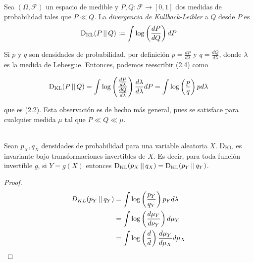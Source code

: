 \documentclass[main.tex]{subfiles}
\begin{document}
\begin{definition}
Sea $(\Omega, \mathcal{F})$ un espacio de medible y $P, Q: \mathcal{F} \to [0,1]$ dos medidas de probabilidad tales que $P\ll Q$. La \textit{divergencia de Kullback-Leibler} a $Q$ desde $P$ es
\begin{equation}
	\operatorname*{D_{KL}}(P\operatorname*{\mid\mid} Q) := \int\log\left(\frac{dP}{dQ}\right)dP
\end{equation}
\end{definition}

Si $p$ y $q$ son densidades de probabilidad, por definición $p=\frac{dP}{d\lambda}$ y $q=\frac{dQ}{d\lambda}$, donde $\lambda$ es la medida de Lebesgue. Entonces, podemos reescribir (2.4) como

\begin{equation*}
\operatorname*{D_{KL}}(P\operatorname*{\mid\mid} Q) = \int\log\left(
		\frac{\frac{dP}{d\lambda}}{\frac{dQ}{d\lambda}}
	\right)
	\frac{d\lambda}{d\lambda}dP	
	= \int\log\left(\frac{p}{q}\right)pd\lambda
\end{equation*}
 
que es (2.2). Esta observación es de hecho más general, pues se satisface para cualquier medida $\mu$ tal que $P\ll Q \ll \mu$. 
\begin{theorem} \ \\
Sean $p_X, q_X$ densidades de probabilidad para una variable aleatoria $X$. $\operatorname*{D_{KL}}$ es invariante bajo  transformaciones invertibles de $X$. Es decir, para toda función invertible $g$, si $Y=g(X)$ entonces $\operatorname*{D_{KL}}(p_X\operatorname*{\mid\mid} q_X) = \operatorname*{D_{KL}}(p_Y\operatorname*{\mid\mid} q_Y)$.

\end{theorem}

\begin{proof} \ \\
\begin{align*}
D_{KL}(p_Y\operatorname*{\mid\mid} q_Y) &= \int\log\left(\frac{p_Y}{q_Y}\right)p_Yd\lambda \\
&= \int \log\left(\frac{d\mu_Y}{d\nu_Y}\right)d\mu_Y \\
&= \int \log\left(\frac{d}{d}\right)\frac{d\mu_Y}{d\mu_X}d\mu_X
\end{align*}

\end{proof}
\end{document}
